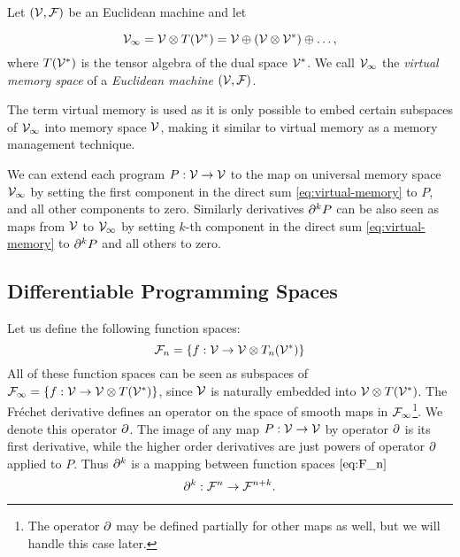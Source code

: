 \begin{definition}\label{def:VV}
Let $(\mathcal{V},\mathcal{F})$ be an Euclidean machine and let  

\begin{equation}
\mathcal{V}_\infty = \mathcal{V}\otimes T(\mathcal{V}^*) = \mathcal{V}\oplus
(\mathcal{V}\otimes\mathcal{V}^*)\oplus\ldots,\label{eq:virtual-memory}
\end{equation}
where $T(\mathcal{V}^*)$ is the tensor algebra of the dual space $\mathcal{V}^*$.
We call $\mathcal{V}_\infty$ the \emph{virtual memory space} of a \emph{Euclidean machine} $(\mathcal{V},\mathcal{F})$.
\end{definition}
The term virtual memory is used as it is only possible to embed certain subspaces of $\mathcal{V}_\infty$ into memory space $\mathcal{V}$, making it similar to
virtual memory as a memory management technique. 

We can extend each program $P:\mathcal{V}\to \mathcal{V}$ to the map on
universal memory space $\mathcal{V}_\infty$ by setting the first component in the direct sum
\eqref{eq:virtual-memory} to $P$, and all other components to zero. Similarly
derivatives $\partial^k P$ can be also seen as maps  from $\mathcal{V}$ to $\mathcal{V}_\infty$ by
setting $k$-th component in the direct sum \eqref{eq:virtual-memory} to $\partial^k P$
and all others to zero.

\subsection{Differentiable Programming Spaces}

Let us define the following function spaces:
 \begin{equation}\label{eq:F_n}
  \mathcal{F}_n=\{f:\mathcal{V}\to \mathcal{V}\otimes T_n(\mathcal{V}^*)\}
 \end{equation}
All of these function spaces can be seen as subspaces of $\mathcal{F}_\infty=\{f:\mathcal{V}\to \mathcal{V}\otimes
T(\mathcal{V}^*)\}$, since $\mathcal{V}$ is naturally embedded into $ \mathcal{V}\otimes T(\mathcal{V}^*)$. The
Fréchet derivative defines an operator on the space of smooth maps in $\mathcal{F}_\infty$\footnote{The operator $\partial$ may be defined partially for other maps as
   well, but we will handle this case later.}. We denote this operator $\partial$. The image of any map
 $P:\mathcal{V}\to \mathcal{V}$ by operator $\partial$ is its first derivative, while the higher order
 derivatives are just powers of operator $\partial$ applied to $P$.
 Thus $\partial^k$ is a mapping between function spaces $\eqref{eq:F_n}$
 \begin{equation}\label{eq:toFn+k}
 \partial^k:\mathcal{F}^n\to\mathcal{F}^{n+k}.
 \end{equation}
 
